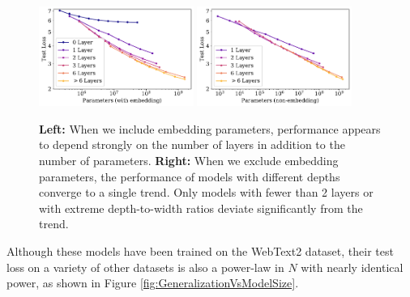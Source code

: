 \documentclass[english]{article}
\begin{document}
\begin{figure}
\noindent \centering{}
\includegraphics[width=0.45\textwidth]{PerfVsModelSizeAllParams}
\includegraphics[width=0.45\textwidth]{PerfVsModelSizeNonEmbed}
\caption[Comparison of performance trend when including or excluding embeddings]{
{\bf Left:} When we include embedding parameters, performance appears to depend strongly on the number of layers in addition to the number of parameters.
{\bf Right:} When we exclude embedding parameters, the performance of models with different depths converge to a single trend. Only models with fewer than 2 layers or with extreme depth-to-width ratios deviate significantly from the trend.  \label{fig:PerformancevsModelSizeBody}}
\end{figure}

Although these models have been trained on the WebText2 dataset, their test loss on a variety of other datasets is also a power-law in $N$ with nearly identical power, as shown in Figure \ref{fig:GeneralizationVsModelSize}.
\end{document}

